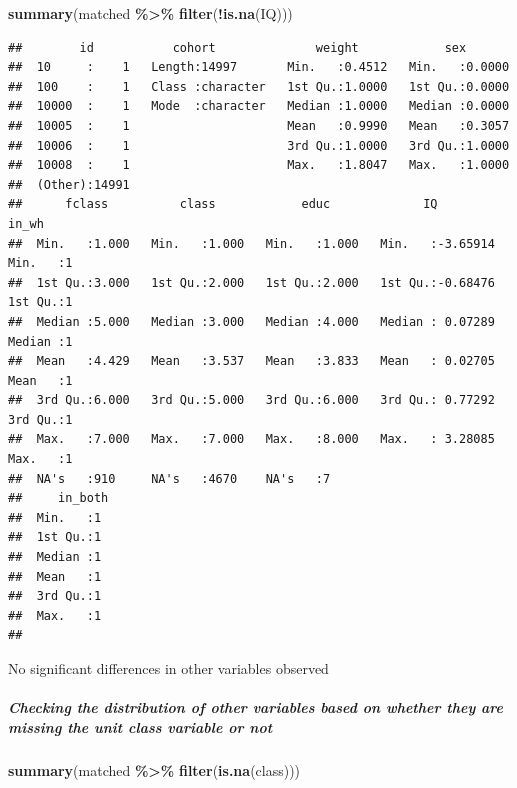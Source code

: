 \documentclass[
]{article}
\newenvironment{Shaded}{\begin{snugshade}}{\end{snugshade}}
\newcommand{\FunctionTok}[1]{\textcolor[rgb]{0.13,0.29,0.53}{\textbf{#1}}}
\newcommand{\NormalTok}[1]{#1}
\newcommand{\SpecialCharTok}[1]{\textcolor[rgb]{0.81,0.36,0.00}{\textbf{#1}}}
\begin{document}
\begin{Shaded}
\begin{Highlighting}[]
\FunctionTok{summary}\NormalTok{(matched }\SpecialCharTok{\%\textgreater{}\%} \FunctionTok{filter}\NormalTok{(}\SpecialCharTok{!}\FunctionTok{is.na}\NormalTok{(IQ)))}
\end{Highlighting}
\end{Shaded}

\begin{verbatim}
##        id           cohort              weight            sex        
##  10     :    1   Length:14997       Min.   :0.4512   Min.   :0.0000  
##  100    :    1   Class :character   1st Qu.:1.0000   1st Qu.:0.0000  
##  10000  :    1   Mode  :character   Median :1.0000   Median :0.0000  
##  10005  :    1                      Mean   :0.9990   Mean   :0.3057  
##  10006  :    1                      3rd Qu.:1.0000   3rd Qu.:1.0000  
##  10008  :    1                      Max.   :1.8047   Max.   :1.0000  
##  (Other):14991                                                       
##      fclass          class            educ             IQ               in_wh  
##  Min.   :1.000   Min.   :1.000   Min.   :1.000   Min.   :-3.65914   Min.   :1  
##  1st Qu.:3.000   1st Qu.:2.000   1st Qu.:2.000   1st Qu.:-0.68476   1st Qu.:1  
##  Median :5.000   Median :3.000   Median :4.000   Median : 0.07289   Median :1  
##  Mean   :4.429   Mean   :3.537   Mean   :3.833   Mean   : 0.02705   Mean   :1  
##  3rd Qu.:6.000   3rd Qu.:5.000   3rd Qu.:6.000   3rd Qu.: 0.77292   3rd Qu.:1  
##  Max.   :7.000   Max.   :7.000   Max.   :8.000   Max.   : 3.28085   Max.   :1  
##  NA's   :910     NA's   :4670    NA's   :7                                     
##     in_both 
##  Min.   :1  
##  1st Qu.:1  
##  Median :1  
##  Mean   :1  
##  3rd Qu.:1  
##  Max.   :1  
## 
\end{verbatim}

No significant differences in other variables observed

\subparagraph{Checking the distribution of other variables based on
whether they are missing the unit class variable or
not}\label{checking-the-distribution-of-other-variables-based-on-whether-they-are-missing-the-unit-class-variable-or-not}

\begin{Shaded}
\begin{Highlighting}[]
\FunctionTok{summary}\NormalTok{(matched }\SpecialCharTok{\%\textgreater{}\%} \FunctionTok{filter}\NormalTok{(}\FunctionTok{is.na}\NormalTok{(class)))}
\end{Highlighting}
\end{Shaded}
\end{document}
